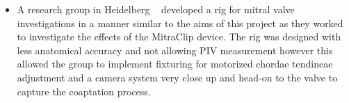 \begin{itemize}
    \item A research group in Heidelberg ~ developed a rig for mitral valve investigations in a manner similar to the aims of this project as they worked to investigate the effects of the MitraClip device. The rig was designed with less anatomical accuracy and not allowing \gls{PIV} measurement however this allowed the group to implement fixturing for motorized chordae tendineae adjustment and a camera system very close up and head-on to the valve to capture the coaptation process.
          \marginpar{
              \centering
              \footnotesize
}
\end{itemize}
